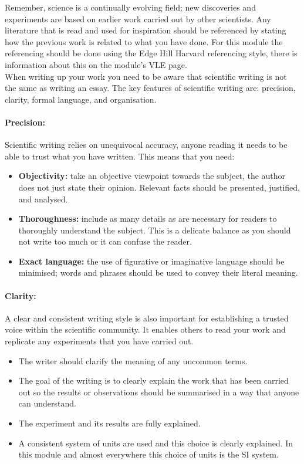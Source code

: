 \documentclass[a4paper,12pt]{book}
\begin{document}
Remember, science is a continually evolving field; new discoveries and experiments are based on earlier work carried out by other scientists. Any literature that is read and used for inspiration should be referenced by stating how the previous work is related to what you have done. For this module the referencing should be done using the Edge Hill Harvard referencing style, there is information about this on the module's VLE page. \\

When writing up your work you need to be aware that scientific writing is not the same as writing an essay. The key features of scientific writing are: precision, clarity, formal language, and organisation. 

\paragraph{Precision:} Scientific writing relies on unequivocal accuracy, anyone reading it needs to be able to trust what you have written. This means that you need:
\begin{itemize}
\setlength{\itemsep}{-5pt}
    \item \textbf{Objectivity:} take an objective viewpoint towards the subject, the author does not just state their opinion. Relevant facts should be presented, justified, and analysed.
    \item \textbf{Thoroughness:} include as many details as are necessary for readers to thoroughly understand the subject. This is a delicate balance as you should not write too much or it can confuse the reader.
    \item \textbf{Exact language:} the use of figurative or imaginative language should be minimised; words and phrases should be used to convey their literal meaning.
\end{itemize}

\paragraph{Clarity:}A clear and consistent writing style is also important for establishing a trusted voice within the scientific community. It enables others to read your work and replicate any experiments that you have carried out.
\begin{itemize}
\setlength{\itemsep}{-5pt}
    \item The writer should clarify the meaning of any uncommon terms.
    \item The goal of the writing is to clearly explain the work that has been carried out so the results or observations should be summarised in a way that anyone can understand.
    \item The experiment and its results are fully explained.
    \item A consistent system of units are used and this choice is clearly explained. In this module and almost everywhere this choice of units is the SI system.
\end{itemize}
\end{document}
